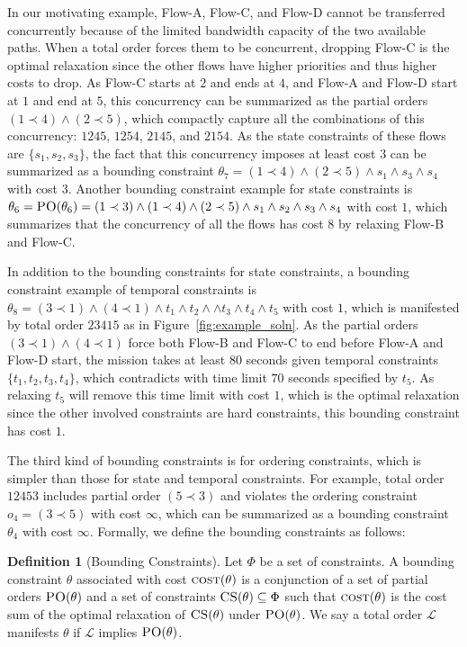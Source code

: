 \documentclass[letterpaper]{article} %
\theoremstyle{definition}
\newtheorem{definition}{Definition}
\begin{document}
In our motivating example, Flow-A, Flow-C, and Flow-D cannot be transferred concurrently because of the limited bandwidth capacity of the two available paths. When a total order forces them to be concurrent, dropping Flow-C is the optimal relaxation since the other flows have higher priorities and thus higher costs to drop. As Flow-C starts at $2$ and ends at $4$, and Flow-A and Flow-D start at $1$ and end at $5$, this concurrency can be summarized as the partial orders $(1 \prec 4) \land (2 \prec 5)$, which compactly capture all the combinations of this concurrency: $1245$, $1254$, $2145$, and $2154$. As the state constraints of these flows are $\{s_1, s_2, s_3\}$, the fact that this concurrency imposes at least cost $3$ can be summarized as a bounding constraint $\theta_7 = (1 \prec 4) \land (2 \prec 5) \land s_1 \land s_3 \land s_4$ with cost $3$. Another bounding constraint example for state constraints is $\theta_6 = \textsc{PO}(\theta_6) = (1 \prec 3) \land (1 \prec 4) \land (2 \prec 5) \land s_1 \land s_2 \land s_3 \land s_4$ with cost $1$, which summarizes that the concurrency of all the flows has cost $8$ by relaxing Flow-B and Flow-C.

In addition to the bounding constraints for state constraints, a bounding constraint example of temporal constraints is $\theta_8 = (3 \prec 1) \land (4 \prec 1) \land t_1 \land t_2 \land \land t_3 \land t_4 \land t_5$ with cost $1$, which is manifested by total order $23415$ as in Figure~\ref{fig:example_soln}. As the partial orders $(3 \prec 1) \land  (4 \prec 1)$ force both Flow-B and Flow-C to end before Flow-A and Flow-D start, the mission takes at least $80$ seconds given temporal constraints $\{t_1, t_2, t_3, t_4\}$, which contradicts with time limit $70$ seconds specified by $t_5$. As relaxing $t_5$ will remove this time limit with cost $1$, which is the optimal relaxation since the other involved constraints are hard constraints, this bounding constraint has cost $1$.

The third kind of bounding constraints is for ordering constraints, which is simpler than those for state and temporal constraints. For example, total order $12453$ includes partial order $(5 \prec 3)$ and violates the ordering constraint $o_4 = (3 \prec 5)$ with cost $\infty$, which can be summarized as a bounding constraint $\theta_4$ with cost $\infty$. Formally, we define the bounding constraints as follows:

\begin{definition}[Bounding Constraints]\label{def:bounding_ordering} 
Let $\Phi$ be a set of constraints. A bounding constraint $\theta$ associated with cost $\textsc{cost}(\theta)$ is a conjunction of a set of partial orders $\textsc{PO}(\theta)$ and a set of constraints $\textsc{CS}(\theta) \subseteq \Phi$ such that $\textsc{cost}(\theta)$ is the cost sum of the optimal relaxation of $\textsc{CS}(\theta)$ under $\textsc{PO}(\theta)$. We say a total order $\mathcal{L}$ manifests $\theta$ if $\mathcal{L}$ implies $\textsc{PO}(\theta)$.
\end{definition}
\end{document}
